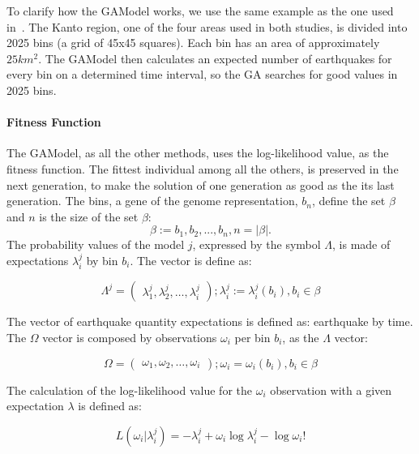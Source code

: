 To clarify how the GAModel works, we use the same example as the one used in~\cite{ecta14}. The Kanto region, one of the four areas used in both studies, is divided into 2025 bins (a grid of 45x45 squares). Each bin has an area of approximately $25km^2$. The GAModel then calculates an expected number of earthquakes for every bin on a determined time interval, so the GA searches for good values in 2025 bins.
\paragraph{Fitness Function}\label{fitGA}

The GAModel, as all the other methods, uses the log-likelihood value, as the fitness
function. The fittest individual among all the others, is preserved in
the next generation, to make the solution of one generation as good as
the its last generation.  The bins, a gene of the genome
representation, $b_n$, define the set $\beta$ and $n$ is the size of
the set $\beta$:
\begin{equation} 
\beta := {b_1,b_2,...,b_n},n = |\beta|.
\end{equation}
The probability values of the model $j$, expressed by the symbol
$\Lambda$, is made of expectations $\lambda_i^j$ by bin $b_i$. The
vector is define as:
				
\begin{equation}
	\Lambda^j = 
\begin{pmatrix}
    \lambda_1^j, 
    \lambda_2^j, 
    \hdots,
    \lambda_i^j
  \end{pmatrix}
  ;\lambda_i^j := \lambda_i^j(b_i),b_i \in \beta
\end{equation}
		
The vector of earthquake quantity expectations is defined as:
earthquake by time. The $\Omega$ vector is composed by observations
$\omega_i$ per bin $b_i$, as the $\Lambda$ vector:

\begin{equation}
\Omega = 
\begin{pmatrix}
    \omega_1,
    \omega_2,
    \hdots,
    \omega_i
  \end{pmatrix}
  ;\omega_i =\omega_i(b_i),b_i \in \beta
\end{equation}

The calculation of the log-likelihood value for the $\omega_i$
observation with a given expectation $\lambda$ is defined as:


\begin{equation}
	L(\omega_i|\lambda_i^j) = -\lambda_i^j + \omega_i\log\lambda_i^j - \log\omega_i!
\end{equation}

